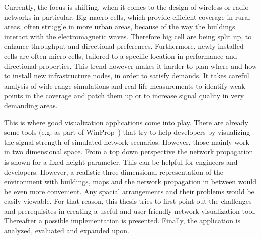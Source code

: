 Currently, the focus is shifting, when it comes to the design of wireless or radio networks in particular. Big macro cells, which provide efficient coverage in rural areas, often struggle in more urban areas, because of the way the buildings interact with the electromagnetic waves. Therefore big cell are being split up, to enhance throughput and directional preferences. Furthermore, newly installed cells are often micro cells, tailored to a specific location in performance and directional properties. This trend however makes it harder to plan where and how to install new infrastructure nodes, in order to satisfy demands. It takes careful analysis of wide range simulations and real life measurements to identify weak points in the coverage and patch them up or to increase signal quality in very demanding areas.

This is where good visualization applications come into play. There are already some tools (e.g. as part of WinProp~\cite{WinProp}) that try to help developers by visualizing the signal strength of simulated network scenarios. However, those mainly work in two dimensional space. From a top down perspective the network propagation is shown for a fixed height parameter. This can be helpful for engineers and developers. However, a realistic three dimensional representation of the environment with buildings, maps and the network propagation in between would be even more convenient. Any spacial arrangements and their problems would be easily viewable. For that reason, this thesis tries to first point out the challenges and prerequisites in creating a useful and user-friendly network visualization tool. Thereafter a possible implementation is presented. Finally, the application is analyzed, evaluated and expanded upon.